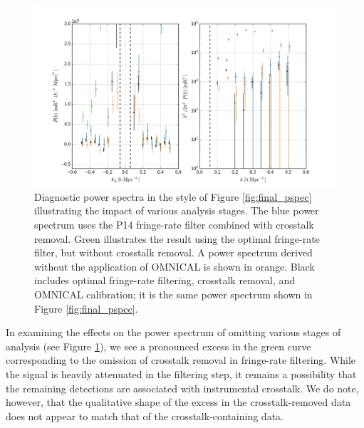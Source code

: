 \documentclass[twocolumn,numberedappendix]{emulateapj} \shorttitle{New Limits on the 21 cm Power Spectrum at $z=8.4$}
\begin{document}
\begin{figure}\centering
\includegraphics[width=2\columnwidth]{plots/pspec_comparison.png}
\caption{
Diagnostic power spectra in the style of Figure \ref{fig:final_pspec}
illustrating the impact of various analysis stages.
The blue power spectrum uses the P14 fringe-rate filter combined with crosstalk removal.
Green illustrates the result using the optimal fringe-rate filter, but without crosstalk removal.
A power spectrum derived without the application of OMNICAL is shown in orange.  Black
includes optimal fringe-rate filtering, crosstalk removal, and OMNICAL calibration; it is the 
same power spectrum shown in Figure \ref{fig:final_pspec}.
}\label{fig:pspec_comp}
\end{figure}


In examining the effects on the power
spectrum of omitting various stages of analysis (see Figure \ref{fig:pspec_comp}), we
see a pronounced excess in the green curve corresponding 
to the omission of crosstalk removal in fringe-rate filtering.
While the signal is heavily attenuated in the filtering step, it remains a
possibility that the remaining detections are associated with instrumental crosstalk.
We do note, however, that the qualitative shape of the excess in the crosstalk-removed data
does not appear to match that of the crosstalk-containing data.
\end{document}
